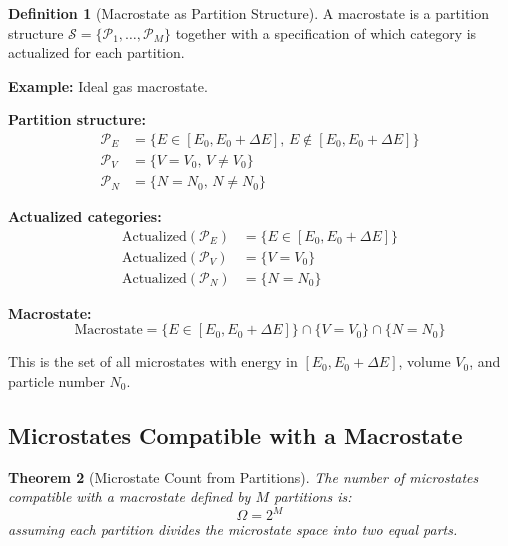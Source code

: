 \documentclass[twocolumn,10pt]{article}
\newtheorem{theorem}{Theorem}[section]
\theoremstyle{definition}
\newtheorem{definition}[theorem]{Definition}
\theoremstyle{remark}
\begin{document}
\begin{definition}[Macrostate as Partition Structure]
\label{def:macrostate}
A macrostate is a partition structure $\mathcal{S} = \{\mathcal{P}_1, \ldots, \mathcal{P}_M\}$ together with a specification of which category is actualized for each partition.
\end{definition}

\noindent\textbf{Example:} Ideal gas macrostate.

\textbf{Partition structure:}
\begin{align}
\mathcal{P}_E &= \{E \in [E_0, E_0 + \Delta E], \, E \notin [E_0, E_0 + \Delta E]\} \\
\mathcal{P}_V &= \{V = V_0, \, V \neq V_0\} \\
\mathcal{P}_N &= \{N = N_0, \, N \neq N_0\}
\end{align}

\textbf{Actualized categories:}
\begin{align}
\text{Actualized}(\mathcal{P}_E) &= \{E \in [E_0, E_0 + \Delta E]\} \\
\text{Actualized}(\mathcal{P}_V) &= \{V = V_0\} \\
\text{Actualized}(\mathcal{P}_N) &= \{N = N_0\}
\end{align}

\textbf{Macrostate:}
\begin{equation}
\text{Macrostate} = \{E \in [E_0, E_0 + \Delta E]\} \cap \{V = V_0\} \cap \{N = N_0\}
\end{equation}

This is the set of all microstates with energy in $[E_0, E_0 + \Delta E]$, volume $V_0$, and particle number $N_0$.

\subsection{Microstates Compatible with a Macrostate}

\begin{theorem}[Microstate Count from Partitions]
\label{thm:microstate_count}
The number of microstates compatible with a macrostate defined by $M$ partitions is:
\begin{equation}
\Omega = 2^M
\end{equation}
assuming each partition divides the microstate space into two equal parts.
\end{theorem}
\end{document}
